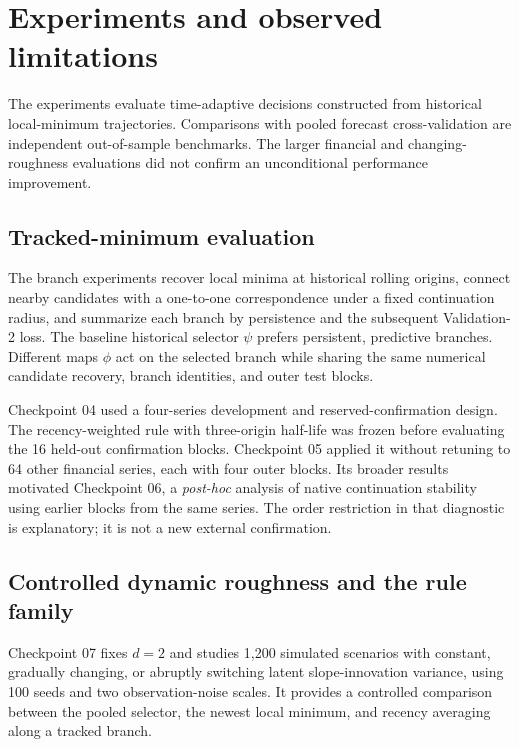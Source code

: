 \section{Experiments and observed limitations}
\label{sec:adaptive_evaluation}

The experiments evaluate time-adaptive decisions constructed from
historical local-minimum trajectories. Comparisons with pooled
forecast cross-validation are independent out-of-sample benchmarks.
The larger financial and changing-roughness evaluations did not
confirm an unconditional performance improvement.

\subsection{Tracked-minimum evaluation}

The branch experiments recover local minima at historical rolling
origins, connect nearby candidates with a one-to-one correspondence
under a fixed continuation radius, and summarize each branch by
persistence and the subsequent Validation-2 loss. The baseline
historical selector $\psi$ prefers persistent, predictive branches.
Different maps $\phi$ act on the selected branch while sharing the
same numerical candidate recovery, branch identities, and outer
test blocks.

Checkpoint 04 used a four-series development and reserved-confirmation
design. The recency-weighted rule with three-origin half-life was
frozen before evaluating the 16 held-out confirmation blocks.
Checkpoint 05 applied it without retuning to 64 other financial
series, each with four outer blocks. Its broader results motivated
Checkpoint 06, a \emph{post-hoc} analysis of native continuation
stability using earlier blocks from the same series. The order
restriction in that diagnostic is explanatory; it is not a new
external confirmation.

\subsection{Controlled dynamic roughness and the rule family}

Checkpoint 07 fixes $d=2$ and studies 1,200 simulated scenarios with
constant, gradually changing, or abruptly switching latent
slope-innovation variance, using 100 seeds and two observation-noise
scales. It provides a controlled comparison between the pooled
selector, the newest local minimum, and recency averaging along a
tracked branch.

